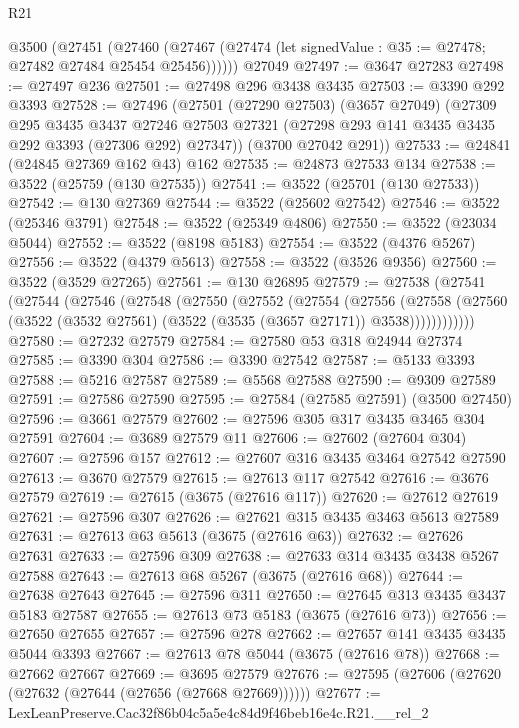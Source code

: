 \begin{lexlean}{R21}
\begin{coremodule}
    @3500
      (@27451
        (@27460 (@27467 (@27474 (let signedValue : @35 := @27478; @27482 @27484 @25454 @25456))))))
    @27049
@27497 := @3647 @27283
@27498 := @27497 @236
@27501 := @27498 @296 @3438 @3435
@27503 := @3390 @292 @3393
@27528 := @27496
    (@27501
      (@27290 @27503)
      (@3657 @27049)
      (@27309
        @295
        @3435
        @3437
        @27246
        @27503
        @27321
        (@27298 @293 @141 @3435 @3435 @292 @3393 (@27306 @292) @27347))
      (@3700 @27042 @291))
@27533 := @24841 (@24845 @27369 @162 @43) @162
@27535 := @24873 @27533 @134
@27538 := @3522 (@25759 (@130 @27535))
@27541 := @3522 (@25701 (@130 @27533))
@27542 := @130 @27369
@27544 := @3522 (@25602 @27542)
@27546 := @3522 (@25346 @3791)
@27548 := @3522 (@25349 @4806)
@27550 := @3522 (@23034 @5044)
@27552 := @3522 (@8198 @5183)
@27554 := @3522 (@4376 @5267)
@27556 := @3522 (@4379 @5613)
@27558 := @3522 (@3526 @9356)
@27560 := @3522 (@3529 @27265)
@27561 := @130 @26895
@27579 := @27538
    (@27541
      (@27544
        (@27546
          (@27548
            (@27550
              (@27552
                (@27554
                  (@27556
                    (@27558
                      (@27560 (@3522 (@3532 @27561) (@3522 (@3535 (@3657 @27171)) @3538))))))))))))
@27580 := @27232 @27579
@27584 := @27580 @53 @318 @24944 @27374
@27585 := @3390 @304
@27586 := @3390 @27542
@27587 := @5133 @3393
@27588 := @5216 @27587
@27589 := @5568 @27588
@27590 := @9309 @27589
@27591 := @27586 @27590
@27595 := @27584 (@27585 @27591) (@3500 @27450)
@27596 := @3661 @27579
@27602 := @27596 @305 @317 @3435 @3465 @304 @27591
@27604 := @3689 @27579 @11
@27606 := @27602 (@27604 @304)
@27607 := @27596 @157
@27612 := @27607 @316 @3435 @3464 @27542 @27590
@27613 := @3670 @27579
@27615 := @27613 @117 @27542
@27616 := @3676 @27579
@27619 := @27615 (@3675 (@27616 @117))
@27620 := @27612 @27619
@27621 := @27596 @307
@27626 := @27621 @315 @3435 @3463 @5613 @27589
@27631 := @27613 @63 @5613 (@3675 (@27616 @63))
@27632 := @27626 @27631
@27633 := @27596 @309
@27638 := @27633 @314 @3435 @3438 @5267 @27588
@27643 := @27613 @68 @5267 (@3675 (@27616 @68))
@27644 := @27638 @27643
@27645 := @27596 @311
@27650 := @27645 @313 @3435 @3437 @5183 @27587
@27655 := @27613 @73 @5183 (@3675 (@27616 @73))
@27656 := @27650 @27655
@27657 := @27596 @278
@27662 := @27657 @141 @3435 @3435 @5044 @3393
@27667 := @27613 @78 @5044 (@3675 (@27616 @78))
@27668 := @27662 @27667
@27669 := @3695 @27579
@27676 := @27595 (@27606 (@27620 (@27632 (@27644 (@27656 (@27668 @27669))))))
@27677 := LexLeanPreserve.Cac32f86b04c5a5e4c84d9f46beb16e4c.R21.__rel_2

\end{coremodule}
\end{lexlean}
